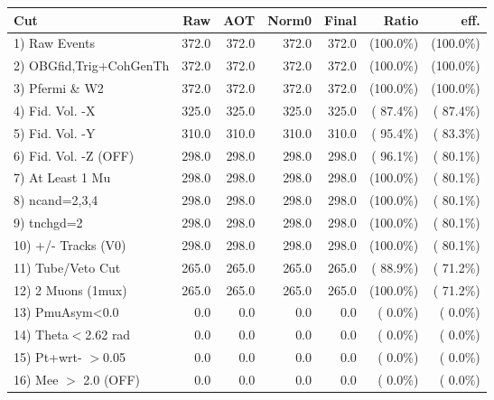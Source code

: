  \begin{table}[h!]\centering
 \begin{tabular}{||l||r|r|r|r|r|r||}
 \hline
 \hline
 Cut & Raw & AOT & Norm0 & Final & Ratio & eff.       \\
 \hline
  1) Raw Events           &        372.0 &        372.0 &        372.0 &        372.0 & (100.0\%) & (100.0\%) \\
  2) OBGfid,Trig+CohGenTh &        372.0 &        372.0 &        372.0 &        372.0 & (100.0\%) & (100.0\%) \\
  3) Pfermi \& W2         &        372.0 &        372.0 &        372.0 &        372.0 & (100.0\%) & (100.0\%) \\
  4) Fid. Vol. -X         &        325.0 &        325.0 &        325.0 &        325.0 & ( 87.4\%) & ( 87.4\%) \\
  5) Fid. Vol. -Y         &        310.0 &        310.0 &        310.0 &        310.0 & ( 95.4\%) & ( 83.3\%) \\
  6) Fid. Vol. -Z (OFF)   &        298.0 &        298.0 &        298.0 &        298.0 & ( 96.1\%) & ( 80.1\%) \\
  7) At Least 1 Mu        &        298.0 &        298.0 &        298.0 &        298.0 & (100.0\%) & ( 80.1\%) \\
  8) ncand=2,3,4          &        298.0 &        298.0 &        298.0 &        298.0 & (100.0\%) & ( 80.1\%) \\
  9) tnchgd=2             &        298.0 &        298.0 &        298.0 &        298.0 & (100.0\%) & ( 80.1\%) \\
 10) +/- Tracks (V0)      &        298.0 &        298.0 &        298.0 &        298.0 & (100.0\%) & ( 80.1\%) \\
 11) Tube/Veto Cut        &        265.0 &        265.0 &        265.0 &        265.0 & ( 88.9\%) & ( 71.2\%) \\
 12) 2 Muons (1mux)       &        265.0 &        265.0 &        265.0 &        265.0 & (100.0\%) & ( 71.2\%) \\
 13) PmuAsym<0.0          &          0.0 &          0.0 &          0.0 &          0.0 & (  0.0\%) & (  0.0\%) \\
 14) Theta$<$2.62 rad     &          0.0 &          0.0 &          0.0 &          0.0 & (  0.0\%) & (  0.0\%) \\
 15) Pt+wrt- $>$0.05      &          0.0 &          0.0 &          0.0 &          0.0 & (  0.0\%) & (  0.0\%) \\
 16) Mee $>$ 2.0  (OFF)   &          0.0 &          0.0 &          0.0 &          0.0 & (  0.0\%) & (  0.0\%) \\

\end{tabular}
\end{table}
